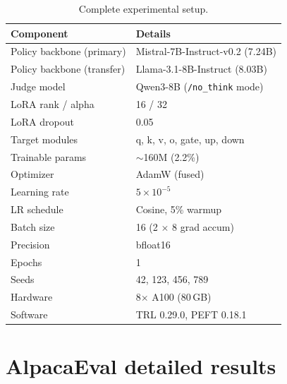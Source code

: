 \documentclass{article}
\begin{document}
\begin{table}[h]
\centering
\caption{Complete experimental setup.}
\vspace{0.5em}
\begin{tabular}{l l}
\toprule
\textbf{Component} & \textbf{Details} \\
\midrule
Policy backbone (primary) & Mistral-7B-Instruct-v0.2 (7.24B) \\
Policy backbone (transfer) & Llama-3.1-8B-Instruct (8.03B) \\
Judge model & Qwen3-8B (\texttt{/no\_think} mode) \\
LoRA rank / alpha & 16 / 32 \\
LoRA dropout & 0.05 \\
Target modules & q, k, v, o, gate, up, down \\
Trainable params & $\sim$160M (2.2\%) \\
Optimizer & AdamW (fused) \\
Learning rate & $5 \times 10^{-5}$ \\
LR schedule & Cosine, 5\% warmup \\
Batch size & 16 (2 $\times$ 8 grad accum) \\
Precision & bfloat16 \\
Epochs & 1 \\
Seeds & 42, 123, 456, 789 \\
Hardware & 8$\times$ A100 (80\,GB) \\
Software & TRL 0.29.0, PEFT 0.18.1 \\
\bottomrule
\end{tabular}
\end{table}

\section{AlpacaEval detailed results}
\label{app:alpaca}
\end{document}
